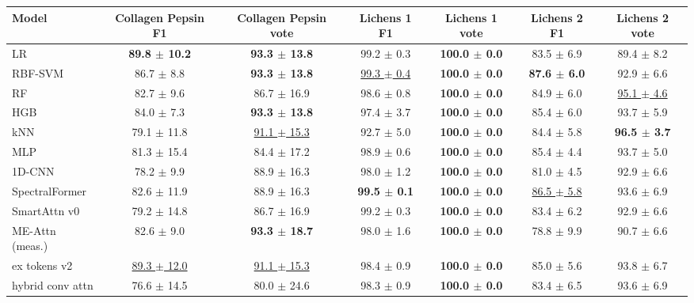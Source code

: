 \small
\begin{tabular}{lcccccc}
\toprule
Model & Collagen Pepsin F1 & Collagen Pepsin vote & Lichens 1 F1 & Lichens 1 vote & Lichens 2 F1 & Lichens 2 vote \\
\midrule
LR & \textbf{89.8 $\pm$ 10.2} & \textbf{93.3 $\pm$ 13.8} & 99.2 $\pm$ 0.3 & \textbf{100.0 $\pm$ 0.0} & 83.5 $\pm$ 6.9 & 89.4 $\pm$ 8.2 \\
RBF-SVM & 86.7 $\pm$ 8.8 & \textbf{93.3 $\pm$ 13.8} & \underline{99.3 $\pm$ 0.4} & \textbf{100.0 $\pm$ 0.0} & \textbf{87.6 $\pm$ 6.0} & 92.9 $\pm$ 6.6 \\
RF & 82.7 $\pm$ 9.6 & 86.7 $\pm$ 16.9 & 98.6 $\pm$ 0.8 & \textbf{100.0 $\pm$ 0.0} & 84.9 $\pm$ 6.0 & \underline{95.1 $\pm$ 4.6} \\
HGB & 84.0 $\pm$ 7.3 & \textbf{93.3 $\pm$ 13.8} & 97.4 $\pm$ 3.7 & \textbf{100.0 $\pm$ 0.0} & 85.4 $\pm$ 6.0 & 93.7 $\pm$ 5.9 \\
kNN & 79.1 $\pm$ 11.8 & \underline{91.1 $\pm$ 15.3} & 92.7 $\pm$ 5.0 & \textbf{100.0 $\pm$ 0.0} & 84.4 $\pm$ 5.8 & \textbf{96.5 $\pm$ 3.7} \\
MLP & 81.3 $\pm$ 15.4 & 84.4 $\pm$ 17.2 & 98.9 $\pm$ 0.6 & \textbf{100.0 $\pm$ 0.0} & 85.4 $\pm$ 4.4 & 93.7 $\pm$ 5.0 \\
1D-CNN & 78.2 $\pm$ 9.9 & 88.9 $\pm$ 16.3 & 98.0 $\pm$ 1.2 & \textbf{100.0 $\pm$ 0.0} & 81.0 $\pm$ 4.5 & 92.9 $\pm$ 6.6 \\
SpectralFormer & 82.6 $\pm$ 11.9 & 88.9 $\pm$ 16.3 & \textbf{99.5 $\pm$ 0.1} & \textbf{100.0 $\pm$ 0.0} & \underline{86.5 $\pm$ 5.8} & 93.6 $\pm$ 6.9 \\
\midrule
SmartAttn v0 & 79.2 $\pm$ 14.8 & 86.7 $\pm$ 16.9 & 99.2 $\pm$ 0.3 & \textbf{100.0 $\pm$ 0.0} & 83.4 $\pm$ 6.2 & 92.9 $\pm$ 6.6 \\
ME-Attn (meas.) & 82.6 $\pm$ 9.0 & \textbf{93.3 $\pm$ 18.7} & 98.0 $\pm$ 1.6 & \textbf{100.0 $\pm$ 0.0} & 78.8 $\pm$ 9.9 & 90.7 $\pm$ 6.6 \\
ex tokens v2 & \underline{89.3 $\pm$ 12.0} & \underline{91.1 $\pm$ 15.3} & 98.4 $\pm$ 0.9 & \textbf{100.0 $\pm$ 0.0} & 85.0 $\pm$ 5.6 & 93.8 $\pm$ 6.7 \\
hybrid conv attn & 76.6 $\pm$ 14.5 & 80.0 $\pm$ 24.6 & 98.3 $\pm$ 0.9 & \textbf{100.0 $\pm$ 0.0} & 83.4 $\pm$ 6.5 & 93.6 $\pm$ 6.9 \\
\bottomrule
\end{tabular}
